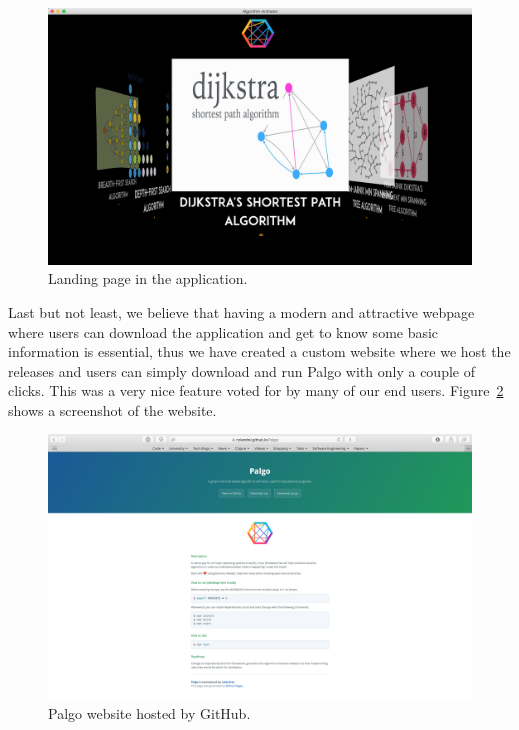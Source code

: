 \documentclass{l4proj}
\begin{document}
\begin{figure}[!ht]
\centering
\includegraphics[scale=0.2]{landing-page}
\caption{Landing page in the application.}
\label{fig:landing-page}
\end{figure}

\pagebreak

Last but not least, we believe that having a modern and attractive webpage where users can download the application and get to
know some basic information is essential, thus we have created a custom website where we host the releases and users can simply
download and run Palgo with only a couple of clicks. This was a very nice feature voted for by many of our end users.
Figure~\ref{fig:palgo-website} shows a screenshot of the website.

\begin{figure}[!ht]
\centering
\includegraphics[scale=0.3]{palgo-website}
\caption{Palgo website hosted by GitHub.}
\label{fig:palgo-website}
\end{figure}
\end{document}
